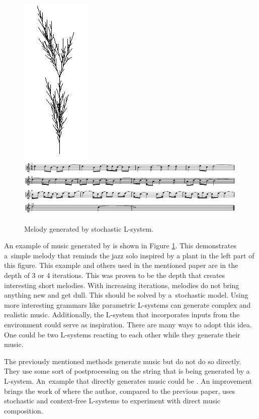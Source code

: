 \begin{figure}[H]
\centering
\hfill
\includegraphics[scale=0.8]{obrazky-figures/cslsa.jpg}
\hfill
\includegraphics[scale=1.4]{obrazky-figures/cslsascore.jpg}
\hfill
\caption{Melody generated by stochastic L-system.}
\label{lsysstoch}
\end{figure}

An example of music generated by \cite{lsystemsmix} is shown in Figure \ref{lsysstoch}. This demonstrates a~simple melody that reminds the jazz solo inspired by a plant in the left part of this figure. This example and others used in the mentioned paper are in the depth of 3 or 4 iterations. This was proven to be the depth that creates interesting short melodies. With increasing iterations, melodies do not bring anything new and get dull. This should be solved by a~stochastic model. Using more interesting grammars like parametric L-systems can generate complex and realistic music. Additionally, the L-system that incorporates inputs from the environment could serve as inspiration. There are many ways to adopt this idea. One could be two L-systems reacting to each other while they generate their music.

The previously mentioned methods generate music but do not do so directly. They use some sort of postprocessing on the string that is being generated by a L-system. An~example that directly generates music could be \cite{straightlsys}. An improvement brings the work of \cite{bachelorthesis} where the author, compared to the previous paper, uses stochastic and context-free L-systems to experiment with direct music composition.

